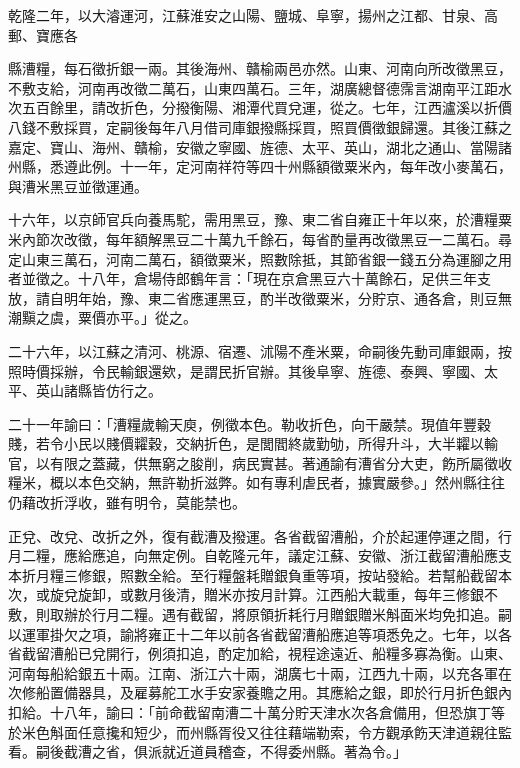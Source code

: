 \begin{pinyinscope}
乾隆二年，以大濬運河，江蘇淮安之山陽、鹽城、阜寧，揚州之江都、甘泉、高郵、寶應各

縣漕糧，每石徵折銀一兩。其後海州、贛榆兩邑亦然。山東、河南向所改徵黑豆，不敷支給，河南再改徵二萬石，山東四萬石。三年，湖廣總督德霈言湖南平江距水次五百餘里，請改折色，分撥衡陽、湘潭代買兌運，從之。七年，江西瀘溪以折價八錢不敷採買，定嗣後每年八月借司庫銀撥縣採買，照買價徵銀歸還。其後江蘇之嘉定、寶山、海州、贛榆，安徽之寧國、旌德、太平、英山，湖北之通山、當陽諸州縣，悉遵此例。十一年，定河南祥符等四十州縣額徵粟米內，每年改小麥萬石，與漕米黑豆並徵運通。

十六年，以京師官兵向養馬駝，需用黑豆，豫、東二省自雍正十年以來，於漕糧粟米內節次改徵，每年額解黑豆二十萬九千餘石，每省酌量再改徵黑豆一二萬石。尋定山東三萬石，河南二萬石，額徵粟米，照數除抵，其節省銀一錢五分為運腳之用者並徵之。十八年，倉場侍郎鶴年言：「現在京倉黑豆六十萬餘石，足供三年支放，請自明年始，豫、東二省應運黑豆，酌半改徵粟米，分貯京、通各倉，則豆無潮黰之虞，粟價亦平。」從之。

二十六年，以江蘇之清河、桃源、宿遷、沭陽不產米粟，命嗣後先動司庫銀兩，按照時價採辦，令民輸銀還欸，是謂民折官辦。其後阜寧、旌德、泰興、寧國、太平、英山諸縣皆仿行之。

二十一年諭曰：「漕糧歲輸天庾，例徵本色。勒收折色，向干嚴禁。現值年豐穀賤，若令小民以賤價糶穀，交納折色，是閭閻終歲勤劬，所得升斗，大半糶以輸官，以有限之蓋藏，供無窮之朘削，病民實甚。著通諭有漕省分大吏，飭所屬徵收糧米，概以本色交納，無許勒折滋弊。如有專利虐民者，據實嚴參。」然州縣往往仍藉改折浮收，雖有明令，莫能禁也。

正兌、改兌、改折之外，復有截漕及撥運。各省截留漕船，介於起運停運之間，行月二糧，應給應追，向無定例。自乾隆元年，議定江蘇、安徽、浙江截留漕船應支本折月糧三修銀，照數全給。至行糧盤耗贈銀負重等項，按站發給。若幫船截留本次，或旋兌旋卸，或數月後清，贈米亦按月計算。江西船大載重，每年三修銀不敷，則取辦於行月二糧。遇有截留，將原領折耗行月贈銀贈米斛面米均免扣追。嗣以運軍掛欠之項，諭將雍正十二年以前各省截留漕船應追等項悉免之。七年，以各省截留漕船已兌開行，例須扣追，酌定加給，視程途遠近、船糧多寡為衡。山東、河南每船給銀五十兩。江南、浙江六十兩，湖廣七十兩，江西九十兩，以充各軍在次修船置備器具，及雇募舵工水手安家養贍之用。其應給之銀，即於行月折色銀內扣給。十八年，諭曰：「前命截留南漕二十萬分貯天津水次各倉備用，但恐旗丁等於米色斛面任意攙和短少，而州縣胥役又往往藉端勒索，令方觀承飭天津道親往監看。嗣後截漕之省，俱派就近道員稽查，不得委州縣。著為令。」


\end{pinyinscope}
